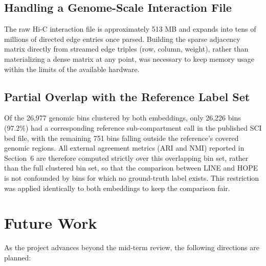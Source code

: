 \documentclass[12pt]{article}
\begin{document}
\subsection{Handling a Genome-Scale Interaction File}
The raw Hi-C interaction file is approximately 513 MB and expands into tens of millions of directed
edge entries once parsed. Building the sparse adjacency matrix directly from streamed edge
triples (row, column, weight), rather than materializing a dense matrix at any point, was necessary
to keep memory usage within the limits of the available hardware.

\subsection{Partial Overlap with the Reference Label Set}
Of the 26,977 genomic bins clustered by both embeddings, only 26,226 bins (97.2\%) had a
corresponding reference sub-compartment call in the published SCI bed file, with the remaining
751 bins falling outside the reference's covered genomic regions. All external agreement metrics
(ARI and NMI) reported in Section~6 are therefore computed strictly over this overlapping bin
set, rather than the full clustered bin set, so that the comparison between LINE and HOPE is not
confounded by bins for which no ground-truth label exists. This restriction was applied
identically to both embeddings to keep the comparison fair.


\section{Future Work}

As the project advances beyond the mid-term review, the following directions are planned:
\end{document}

